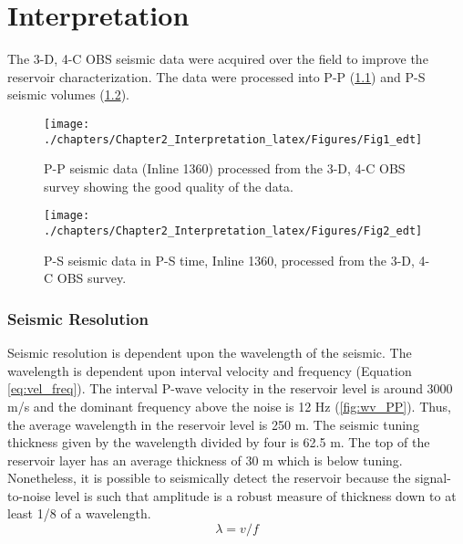 \chapter{Interpretation}

The 3-D, 4-C OBS seismic data were acquired over the field to improve the reservoir characterization. The data were processed into  P-P (\ref{fig:PP_line1360}) and P-S seismic volumes  (\ref{fig:PS_line1360}). 

\begin{figure}[hbtp]
	\begin{center}
	\texttt{[image: ./chapters/Chapter2\_Interpretation\_latex/Figures/Fig1\_edt]}
			\caption[P-P seismic data in P-P time, Inline 1360.]{P-P seismic data (Inline 1360) processed from the 3-D, 4-C OBS survey showing the good quality of the data.}
			\label{fig:PP_line1360}
		\end{center}
	\end{figure}
	
\begin{figure}[hbtp]
	\begin{center}
	\texttt{[image: ./chapters/Chapter2\_Interpretation\_latex/Figures/Fig2\_edt]}
			\caption[P-S seismic data in P-S time, Inline 1360.]{P-S seismic data in P-S time, Inline 1360, processed from the 3-D, 4-C OBS survey. }
			\label{fig:PS_line1360}
		\end{center}
	\end{figure}


\subsection{Seismic Resolution}

Seismic resolution is dependent upon the wavelength of the seismic. The wavelength is dependent upon interval velocity and frequency (Equation \ref{eq:vel_freq}).  The interval P-wave velocity in the reservoir level is around 3000 m/s and the dominant frequency above the noise is 12 Hz (\ref{fig:wv_PP}). Thus, the average wavelength in the reservoir level is 250 m. The seismic tuning thickness given by the wavelength divided by four is 62.5 m. The top of the reservoir layer has an average thickness of 30 m which is below tuning. Nonetheless, it is possible to seismically detect the reservoir because the signal-to-noise level is such that amplitude is a robust measure of thickness down to at least 1/8 of a wavelength. 
\begin{equation} 
\lambda=v/f
\label{eq:vel_freq}
\end{equation} 

